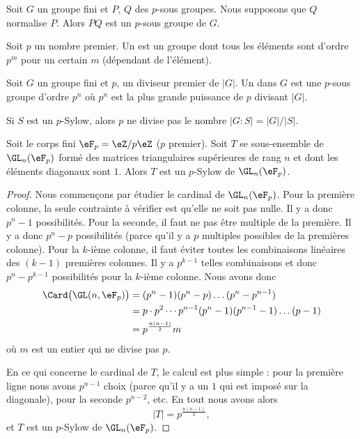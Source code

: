 \begin{lemma}
    Soit \( G\) un groupe fini et \( P\), \( Q\) des \( p\)-sous groupes. Nous supposons que \( Q\) normalise \( P\). Alors \( PQ\) est un \( p\)-sous groupe de \( G\).
\end{lemma}


\begin{definition}
    Soit \( p\) un nombre premier. Un  est un groupe dont tous les éléments sont d'ordre \( p^m\) pour un certain \( m\) (dépendant de l'élément).

    Soit \( G\) un groupe fini et \( p\), un diviseur premier de $| G |$. Un  dans \( G\) est une \( p\)-sous groupe d'ordre \( p^n\) où \( p^n\) est la plus grande puissance de \( p\) divisant \( | G |\).
\end{definition}

Si \( S\) est un \( p\)-Sylow, alors \( p\) ne divise pas le nombre \( | G:S |=| G |/| S |\).

\begin{proposition}     \label{Propvocmon}
    Soit le corps fini \( \eF_p=\eZ/p\eZ\) (\( p\) premier). Soit \( T\) se sous-ensemble de \( \GL_n(\eF_p)\) formé des matrices triangulaires supérieures de rang \( n\) et dont les éléments diagonaux sont \( 1\). Alors \( T\) est un \( p\)-Sylow de \( \GL_n(\eF_p)\).
\end{proposition}

\begin{proof}
    Nous commençons par étudier le cardinal de \( \GL_n(\eF_p)\). Pour la première colonne, la seule contrainte à vérifier est qu'elle ne soit pas nulle. Il y a donc \( p^n-1\) possibilités. Pour la seconde, il faut ne pas être multiple de la première. Il y a donc \( p^n-p\) possibilités (parce qu'il y a \( p\) multiples possibles de la premières colonne). Pour la \( k\)-ième colonne, il faut éviter toutes les combinaisons linéaires des \( (k-1)\) premières colonnes. Il y a \( p^{k-1}\) telles combinaisons et donc \( p^n-p^{k-1}\) possibilités pour la \( k\)-ième colonne. Nous avons donc
    \begin{subequations}
        \begin{align}
            \Card\big( \GL(n,\eF_{p}) \big)&=(p^n-1)(p^n-p)\ldots(p^n-p^{n-1})\\
            &=p\cdot p^2\cdots p^{n-1}(p^n-1)(p^{n-1}-1)\ldots (p-1)\\
            &=p^{\frac{ n(n-1) }{2}}m
        \end{align}
    \end{subequations}
    où \( m\) est un entier qui ne divise pas \( p\).

    En ce qui concerne le cardinal de \( T\), le calcul est plus simple : pour la première ligne nous avons \( p^{n-1}\) choix (parce qu'il y a un \( 1\) qui est imposé sur la diagonale), pour la seconde \( p^{n-2}\), etc. En tout nous avons alors
    \begin{equation}
        | T |=p^{\frac{ n(n-1) }{2}},
    \end{equation}
    et \( T\) est un \( p\)-Sylow de \( \GL_n(\eF_p)\).
\end{proof}


